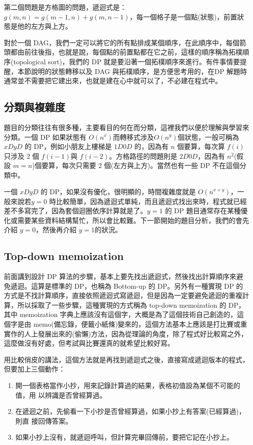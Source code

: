 \documentclass[a4paper, 11pt, oneside]{book}
\begin{document}
第二個問題是方格圖的問題，遞迴式是：$g(m,n)=g(m-1,n)+g(m,n-1)$，每一個格子是一個點(狀態)，前置狀態是他的左方與上方。

對於一個 DAG，我們一定可以將它的所有點排成某個順序，在此順序中，每個箭頭都由前往後指，也就是說，每個點的前置點都在它之前，這樣的順序稱為拓樸順序(topological sort)，我們的 DP 就是要沿著一個拓樸順序來進行。有件事情要提醒，本節說明的狀態轉移以及 DAG 與拓樸順序，是方便思考用的，在DP 解題時通常並不需要把它建出來，也就是建在心中就可以了，不必建在程式中。

\subsection{分類與複雜度}
題目的分類往往有很多種，主要看目的何在而分類，這裡我們以便於理解與學習來分類。一個 DP 如果狀態有 $O(n^x)$而轉移式涉及$O(n^y)$個狀態，一般可稱為 $xDyD$ 的 DP，例如小朋友上樓梯是 $1D0D$ 的，因為有 $n$ 個要算，每次算 $f(i)$只涉及 2 個 $f(i-1)$與 $f(i-2)$。方格路徑的問題則是 $2D0D$，因為有 $n^2$(假設 $m=n$)個要算，每次只需要 2 個(左方與上方)。當然也有一些 DP 不在這個分類中。

一個 $xDyD$ 的 DP，如果沒有優化，很明顯的，時間複雜度就是 $O(n^{x+y})$，一般來說若$y=0$ 時比較簡單，因為遞迴式單純，而且遞迴式找出來時，程式就已經差不多寫完了，因為套個迴圈依序計算就是了。$y=1$ 的 DP 題目通常存在某種優化或需要某些資料結構幫忙，所以會比較難。下一節開始的題目分析，我們的會先介紹 $y=0$，然後再介紹 $y=1$的狀況。

\subsection{Top-down memoization}
前面講到設計 DP 算法的步驟，基本上要先找出遞迴式，然後找出計算順序來避免遞迴。這算是標準的 DP，也稱為 Bottom-up 的 DP。另外有一種實現 DP 的方式是不找計算順序，直接依照遞迴式寫遞迴，但是因為一定要避免遞迴的重複計算，所以採取了一些步驟，這種實現的方式稱為 top-down memoization 的 DP，其中 memoization 字典上應該沒有這個字，大概是為了這個技術自己創造的，這個字是由 memo(備忘錄，便籤小紙條)變來的，這個方法基本上應該是打比賽或重實作的人上發展出來的(偷懶)方法，因為從理論的角度，除了程式好比較寫之外，這麼做沒有好處，但考試與比賽還真的就希望比較好寫。

用比較俏皮的講法，這個方法就是再找到遞迴式之後，直接寫成遞迴版本的程式，但要加上三個動作：

\begin{enumerate}
    \item 開一個表格當作小抄，用來記錄計算過的結果，表格初值設為某個不可能的值，用
以辨識是否曾經算過。
    \item 在遞迴之前，先偷看一下小抄是否曾經算過，如果小抄上有答案(已經算過)，則直
接回傳答案。
    \item 如果小抄上沒有，就遞迴呼叫，但計算完畢回傳前，要把它記在小抄上。
\end{enumerate}
\end{document}
